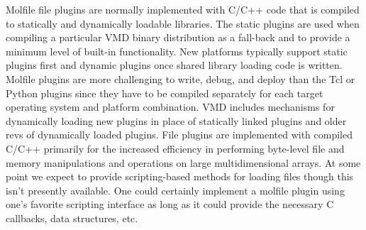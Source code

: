 Molfile file plugins are normally implemented with C/C++ code that is compiled to statically and dynamically loadable libraries. The static plugins are used when compiling a particular VMD binary  distribution as a fall-back and to provide a minimum level of built-in functionality. New platforms typically support static plugins first and dynamic plugins once shared library loading code is written. Molfile plugins are more challenging to write, debug, and deploy than the Tcl or Python plugins since they have to be compiled separately for each target operating system and platform combination. VMD includes mechanisms for dynamically loading new plugins in place of statically linked plugins and older revs of dynamically loaded  plugins. File plugins are implemented with compiled C/C++ primarily for the increased efficiency in performing byte-level file and memory manipulations and operations on large multidimensional arrays. At some point we expect to provide scripting-based methods for loading files though this isn't presently available. One could certainly implement a molfile plugin using one's favorite scripting interface as long as it could provide the necessary C callbacks, data structures, etc.

